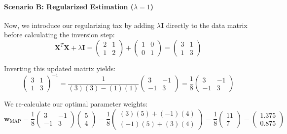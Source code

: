 \documentclass{article}
\begin{document}
\paragraph{Scenario B: Regularized Estimation ($\lambda = 1$)}
Now, we introduce our regularizing tax by adding $\lambda \mathbf{I}$ directly to the data matrix before calculating the inversion step:
\begin{equation}
\mathbf{X}^T\mathbf{X} + \lambda \mathbf{I} = \begin{pmatrix} 2 & 1 \\ 1 & 2 \end{pmatrix} + \begin{pmatrix} 1 & 0 \\ 0 & 1 \end{pmatrix} = \begin{pmatrix} 3 & 1 \\ 1 & 3 \end{pmatrix}
\end{equation}

Inverting this updated matrix yields:
\begin{equation}
\begin{pmatrix} 3 & 1 \\ 1 & 3 \end{pmatrix}^{-1} = \frac{1}{(3)(3) - (1)(1)}\begin{pmatrix} 3 & -1 \\ -1 & 3 \end{pmatrix} = \frac{1}{8}\begin{pmatrix} 3 & -1 \\ -1 & 3 \end{pmatrix}
\end{equation}

We re-calculate our optimal parameter weights:
\begin{equation}
\mathbf{w}_{\text{MAP}} = \frac{1}{8}\begin{pmatrix} 3 & -1 \\ -1 & 3 \end{pmatrix} \begin{pmatrix} 5 \\ 4 \end{pmatrix} = \frac{1}{8}\begin{pmatrix} (3)(5) + (-1)(4) \\ (-1)(5) + (3)(4) \end{pmatrix} = \frac{1}{8}\begin{pmatrix} 11 \\ 7 \end{pmatrix} = \begin{pmatrix} 1.375 \\ 0.875 \end{pmatrix}
\end{equation}
\end{document}
